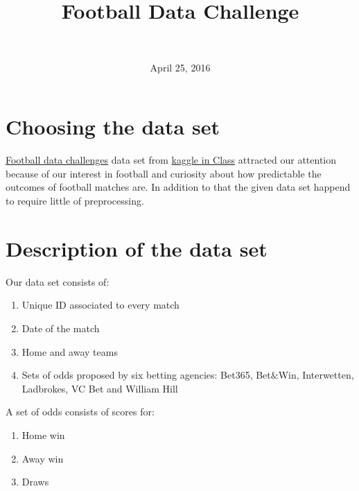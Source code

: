 \documentclass[11pt]{article}
\title{Football Data Challenge}
\author{\text{\small{prepared by} \large{Dimitri Lajou, Pijus Simonaitis}} \\ \text{\large{ENS Lyon, DBDM M1}}}
\date{April 25, 2016}
\begin{document}
\maketitle

\section{Choosing the data set}

\href{https://inclass.kaggle.com/c/football-data-challenge/}{Football data challenges} data set from \href{https://inclass.kaggle.com/}{kaggle in Class} attracted our attention because of our interest in football and curiosity about how predictable the outcomes of football matches are. In addition to that the given data set happend to require little of preprocessing.

\section{Description of the data set}

Our data set consists of:
\begin{enumerate}
		\item Unique ID associated to every match
		\item Date of the match
		\item Home and away teams
		\item Sets of odds proposed by six betting agencies: Bet365, Bet$\&$Win, Interwetten, Ladbrokes, VC Bet and William Hill 
\end{enumerate}

A set of odds consists of scores for:

\begin{enumerate}
		\item Home win
		\item Away win
		\item Draws 
\end{enumerate}
\end{document}
